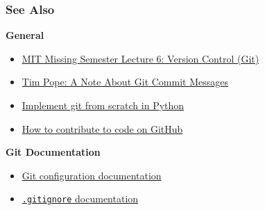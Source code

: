 \documentclass{beamer} \usetheme{Madrid}
\begin{document}
\begin{frame}
    \frametitle{See Also}
    \centering \textbf{General}
    \begin{itemize}
        \setlength\itemsep{1em}
        \item \href{https://missing.csail.mit.edu/2020/version-control/}{MIT Missing Semester Lecture 6: Version Control (Git)}
        \item \href{https://tbaggery.com/2008/04/19/a-note-about-git-commit-messages.html}{Tim Pope: A Note About Git Commit Messages}
        \item \href{https://wyag.thb.lt/}{Implement git from scratch in Python}
        \item
            \href{https://docs.github.com/en/free-pro-team@latest/github/collaborating-with-issues-and-pull-requests/about-pull-requests}{How to contribute to code on GitHub}
    \end{itemize}
    \vfill
    \centering \textbf{Git Documentation}
    \begin{itemize}
        \item \href{https://git-scm.com/docs/git-config}{Git configuration documentation}
        \item \href{https://git-scm.com/docs/gitignore}{\texttt{.gitignore} documentation}
    \end{itemize}
\end{frame}
\end{document}
